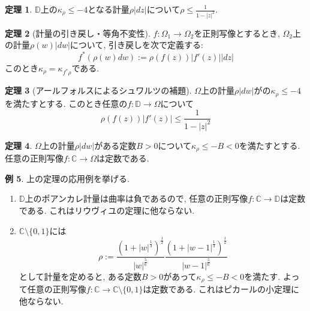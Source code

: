 \documentclass[dvipdfmx,a4paper,11pt]{article}
\newcommand{\C}{\mathbb{C}}
\newcommand{\D}{\mathbb{D}}
\theoremstyle{definition}
\newtheorem{thm}{定理}
\newtheorem{exa}[thm]{例}
\begin{document}
\begin{tcolorbox}[
    colback = white,
    colframe = green!35!black,
    fonttitle = \bfseries,
    breakable = true]
    \begin{thm}
    $\D$上の$\kappa_{\rho} \le -4$となる計量$\rho|dz|$について$\rho \le \frac{1}{1 - |z|^2}$.
    \end{thm}
\end{tcolorbox}

\begin{tcolorbox}[
    colback = white,
    colframe = green!35!black,
    fonttitle = \bfseries,
    breakable = true]
    \begin{thm}[計量の引き戻し・等角不変性]
$f : \Omega_1 \rightarrow \Omega_2$を正則写像とするとき, 
$\Omega_2$上の計量$\rho(w)|dw|$について, 引き戻しを次で定義する:
$$
f^{*}(\rho(w) dw) := \rho(f(z)) |f' (z)| |dz|
$$
このとき$\kappa_{\rho}= \kappa_{f^{*}\rho}$である.
    \end{thm}
\end{tcolorbox}



\begin{tcolorbox}[
    colback = white,
    colframe = green!35!black,
    fonttitle = \bfseries,
    breakable = true]
    \begin{thm}[アールフォルスによるシュワルツの補題]
       $\Omega$上の計量$\rho|dw|$がの$\kappa_{\rho} \le -4$を満たすとする.
       このとき任意の$f : \D \rightarrow \Omega$について
       $$
       \rho(f(z)) |f'(z)| \le \frac{1}{1 - |z|^2}
       $$
    \end{thm}
\end{tcolorbox}

\begin{tcolorbox}[
    colback = white,
    colframe = green!35!black,
    fonttitle = \bfseries,
    breakable = true]
    \begin{thm}
       $\Omega$上の計量$\rho|dw|$がある定数$B>0$について$\kappa_{\rho} \le -B <0$を満たすとする.
任意の正則写像$f : \C \rightarrow \Omega$は定数である.
    \end{thm}
\end{tcolorbox}
\begin{exa}
上の定理の応用例を挙げる. 
    \begin{enumerate}
    \setlength{\parskip}{0cm} 
  \setlength{\itemsep}{0cm} 
  \item $\D$上のポアンカレ計量は曲率は負であるので, 任意の正則写像$f : \C \rightarrow \D$は定数である. これはリウヴィユの定理に他ならない.
  \item $ \C \setminus \{ 0,1\}$には
  $$
  \rho := \frac{(1 + |w|^{\frac{1}{3}})^{\frac{1}{2}}}{|w|^{\frac{5}{6}}} \frac{(1 + |w-1|^{\frac{1}{3}})^{\frac{1}{2}}}{|w-1|^{\frac{5}{6}}}
  $$
  として計量を定めると, ある定数$B>0$があって$\kappa_{\rho} \le -B <0$を満たす. 
  よって任意の正則写像$f : \C \rightarrow  \C \setminus \{ 0,1\}$は定数である. これはピカールの小定理に他ならない. 
  \end{enumerate}
\end{exa}


 
\end{document}
